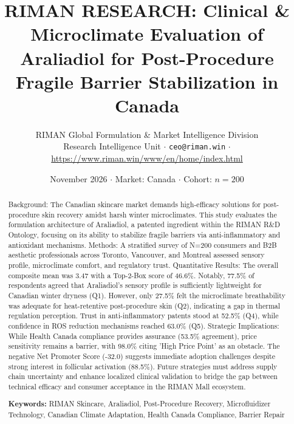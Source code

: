 \documentclass[10pt,twocolumn,a4paper]{article}
\title{\textbf{RIMAN RESEARCH: Clinical \& Microclimate Evaluation of Araliadiol for Post-Procedure Fragile Barrier Stabilization in Canada}}
\author{RIMAN Global Formulation \& Market Intelligence Division\\
\small Research Intelligence Unit $\cdot$ \texttt{ceo@riman.win} $\cdot$ \url{https://www.riman.win/www/en/home/index.html}}
\date{November 2026 \quad $\cdot$ \quad Market: Canada \quad $\cdot$ \quad Cohort: $n = 200$}
\begin{document}
\maketitle

\begin{abstract}
Background: The Canadian skincare market demands high-efficacy solutions for post-procedure skin recovery amidst harsh winter microclimates. This study evaluates the formulation architecture of Araliadiol, a patented ingredient within the RIMAN R\&D Ontology, focusing on its ability to stabilize fragile barriers via anti-inflammatory and antioxidant mechanisms. Methods: A stratified survey of N=200 consumers and B2B aesthetic professionals across Toronto, Vancouver, and Montreal assessed sensory profile, microclimate comfort, and regulatory trust. Quantitative Results: The overall composite mean was 3.47 with a Top-2-Box score of 46.6\%. Notably, 77.5\% of respondents agreed that Araliadiol’s sensory profile is sufficiently lightweight for Canadian winter dryness (Q1). However, only 27.5\% felt the microclimate breathability was adequate for heat-retentive post-procedure skin (Q2), indicating a gap in thermal regulation perception. Trust in anti-inflammatory patents stood at 52.5\% (Q4), while confidence in ROS reduction mechanisms reached 63.0\% (Q5). Strategic Implications: While Health Canada compliance provides assurance (53.5\% agreement), price sensitivity remains a barrier, with 98.0\% citing 'High Price Point' as an obstacle. The negative Net Promoter Score (-32.0) suggests immediate adoption challenges despite strong interest in follicular activation (88.5\%). Future strategies must address supply chain uncertainty and enhance localized clinical validation to bridge the gap between technical efficacy and consumer acceptance in the RIMAN Mall ecosystem.

\vspace{0.4em}
\noindent\textbf{Keywords:} RIMAN Skincare, Araliadiol, Post-Procedure Recovery, Microfluidizer Technology, Canadian Climate Adaptation, Health Canada Compliance, Barrier Repair
\end{abstract}
\end{document}
